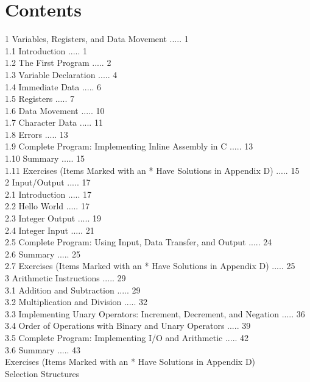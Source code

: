 \documentclass[10pt]{book}
\begin{document}
\section{Contents}
1 Variables, Registers, and Data Movement ..... 1\\
1.1 Introduction ..... 1\\
1.2 The First Program ..... 2\\
1.3 Variable Declaration ..... 4\\
1.4 Immediate Data ..... 6\\
1.5 Registers ..... 7\\
1.6 Data Movement ..... 10\\
1.7 Character Data ..... 11\\
1.8 Errors ..... 13\\
1.9 Complete Program: Implementing Inline Assembly in C ..... 13\\
1.10 Summary ..... 15\\
1.11 Exercises (Items Marked with an * Have Solutions in Appendix D) ..... 15\\
2 Input/Output ..... 17\\
2.1 Introduction ..... 17\\
2.2 Hello World ..... 17\\
2.3 Integer Output ..... 19\\
2.4 Integer Input ..... 21\\
2.5 Complete Program: Using Input, Data Transfer, and Output ..... 24\\
2.6 Summary ..... 25\\
2.7 Exercises (Items Marked with an * Have Solutions in Appendix D) ..... 25\\
3 Arithmetic Instructions ..... 29\\
3.1 Addition and Subtraction ..... 29\\
3.2 Multiplication and Division ..... 32\\
3.3 Implementing Unary Operators: Increment, Decrement, and Negation ..... 36\\
3.4 Order of Operations with Binary and Unary Operators ..... 39\\
3.5 Complete Program: Implementing I/O and Arithmetic ..... 42\\
3.6 Summary ..... 43\\
 Exercises (Items Marked with an * Have Solutions in Appendix D) \\
 Selection Structures \\
\end{document}

